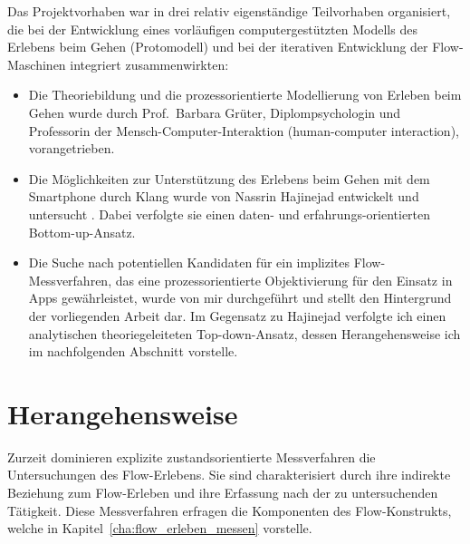 Das Projektvorhaben war in drei relativ eigenständige Teilvorhaben organisiert, die bei der Entwicklung eines vorläufigen computergestützten Modells des Erlebens beim Gehen (Protomodell) und bei der iterativen Entwicklung der Flow-Maschinen integriert zusammenwirkten: 
\begin{itemize}
	
	\item Die Theoriebildung und die prozessorientierte Modellierung von Erleben beim Gehen wurde durch Prof.\ Barbara Grüter, Diplompsychologin und Professorin der Mensch-Computer-Interaktion (human-computer interaction), vorangetrieben.
	
	\item Die Möglichkeiten zur Unterstützung des Erlebens beim Gehen mit dem Smartphone durch Klang wurde von Nassrin Hajinejad entwickelt und untersucht \citep{Hajinejad2013, Hajinejad2015}. Dabei verfolgte sie einen daten- und erfahrungs-orientierten Bottom-up-Ansatz.
	
	\item Die Suche nach potentiellen Kandidaten für ein implizites Flow-Messverfahren, das eine prozessorientierte Objektivierung für den Einsatz in Apps gewährleistet, wurde von mir durchgeführt und stellt den Hintergrund der vorliegenden Arbeit dar. Im Gegensatz zu Hajinejad verfolgte ich einen analytischen theoriegeleiteten Top-down-Ansatz, dessen Herangehensweise ich im nachfolgenden Abschnitt vorstelle. 
\end{itemize}

\section{Herangehensweise} 

\label{sec:herangehensweise}

Zurzeit dominieren explizite zustandsorientierte Messverfahren die Untersuchungen des Flow-Erlebens. Sie sind charakterisiert durch ihre indirekte Beziehung zum Flow-Erleben und ihre Erfassung nach der zu untersuchenden Tätigkeit. Diese Messverfahren erfragen die Komponenten des Flow-Konstrukts, welche in Kapitel~\ref{cha:flow_erleben_messen} vorstelle. 

